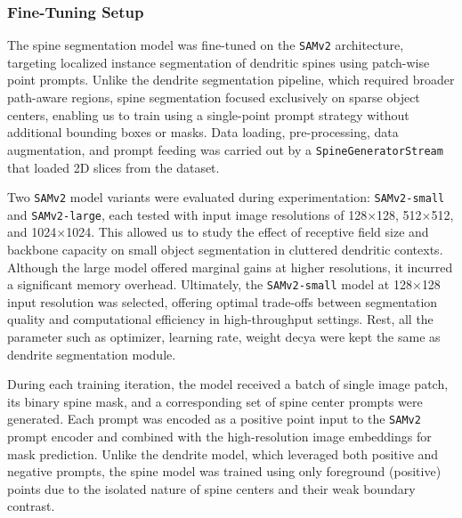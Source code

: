 \subsubsection{\textbf{Fine-Tuning Setup}}

The spine segmentation model was fine-tuned on the \texttt{\gls{SAMv2}} architecture, targeting localized instance segmentation of dendritic spines using patch-wise point prompts. Unlike the dendrite segmentation pipeline, which required broader path-aware regions, spine segmentation focused exclusively on sparse object centers, enabling us to train using a single-point prompt strategy without additional bounding boxes or masks. Data loading, pre-processing, data augmentation, and prompt feeding was carried out by a \texttt{SpineGeneratorStream} that loaded 2D slices from the dataset. 

Two \texttt{\gls{SAMv2}} model variants were evaluated during experimentation: \texttt{\gls{SAMv2}-small} and \texttt{\gls{SAMv2}-large}, each tested with input image resolutions of 128$\times$128, 512$\times$512, and 1024$\times$1024. This allowed us to study the effect of receptive field size and backbone capacity on small object segmentation in cluttered dendritic contexts. Although the large model offered marginal gains at higher resolutions, it incurred a significant memory overhead. Ultimately, the \texttt{\gls{SAMv2}-small} model at 128$\times$128 input resolution was selected, offering optimal trade-offs between segmentation quality and computational efficiency in high-throughput settings. Rest, all the parameter such as optimizer, learning rate, weight decya were kept the same as dendrite segmentation module. 


During each training iteration, the model received a batch of single image patch, its binary spine mask, and a corresponding set of spine center prompts were generated. Each prompt was encoded as a positive point input to the \texttt{\gls{SAMv2}} prompt encoder and combined with the high-resolution image embeddings for mask prediction. Unlike the dendrite model, which leveraged both positive and negative prompts, the spine model was trained using only foreground (positive) points due to the isolated nature of spine centers and their weak boundary contrast.

